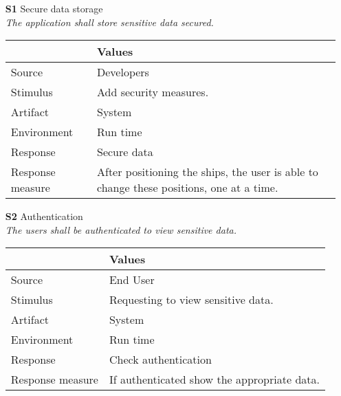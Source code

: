 \begin{itemize}
    \item[\textbf{S1}] Secure data storage \\
    \textit{\small{The application shall store sensitive data secured.}}
        
    \begin{tabular}{| l | p{7cm} |}
        \hline
        \rowcolor[gray]{0.8}
        \textbf{} & \textbf{Values} \\
        \hline
        Source & Developers \\
        Stimulus & Add security measures. \\
        Artifact & System \\
        Environment & Run time \\
        Response & Secure data  \\
        Response measure & After positioning the ships, the user is able to change these positions, one at a time. \\
        \hline
    \end{tabular}

    \item[\textbf{S2}] Authentication \\
    \textit{\small{The users shall be authenticated to view sensitive data.}}
        
    \begin{tabular}{| l | p{7cm} |}
        \hline
        \rowcolor[gray]{0.8}
        \textbf{} & \textbf{Values} \\
        \hline
        Source & End User \\
        Stimulus & Requesting to view sensitive data. \\
        Artifact & System \\
        Environment & Run time \\
        Response & Check authentication \\
        Response measure & If authenticated show the appropriate data. \\
        \hline
    \end{tabular}
\end{itemize}
